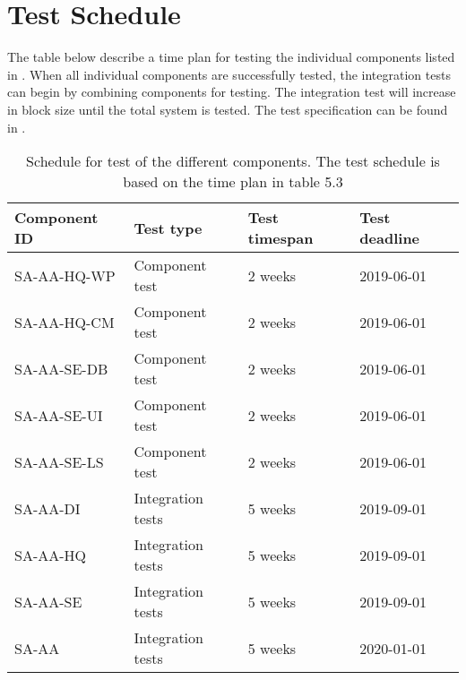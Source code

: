 \chapter{Test Schedule}
\label{chp:TestSchedule}

The table below describe a time plan for testing the individual components listed in \ddd.
When all individual components are successfully tested, the integration tests can begin by combining components for testing.
The integration test will increase in block size until the total system is tested.
The test specification can be found in \std.

\begin{table}[ht]
    \centering
    \begin{tabular}{|l|l|l|l|}
        \hline 
        \textbf{Component ID} & \textbf{Test type} & \textbf{Test timespan} & \textbf{Test deadline} \\
        \hline
        SA-AA-HQ-WP & Component test    & 2 weeks & 2019-06-01 \\
        \hline
        SA-AA-HQ-CM & Component test    & 2 weeks & 2019-06-01 \\
        \hline
        SA-AA-SE-DB & Component test    & 2 weeks & 2019-06-01 \\
        \hline
        SA-AA-SE-UI & Component test    & 2 weeks & 2019-06-01 \\
        \hline
        SA-AA-SE-LS & Component test    & 2 weeks & 2019-06-01 \\
        \hline
        SA-AA-DI    & Integration tests & 5 weeks & 2019-09-01 \\
        \hline
        SA-AA-HQ    & Integration tests & 5 weeks & 2019-09-01 \\
        \hline
        SA-AA-SE    & Integration tests & 5 weeks & 2019-09-01 \\
        \hline
        SA-AA       & Integration tests & 5 weeks & 2020-01-01 \\
        \hline
    \end{tabular}
    \caption{Schedule for test of the different components. The test schedule is based on the time plan in \semp table 5.3}
\end{table}